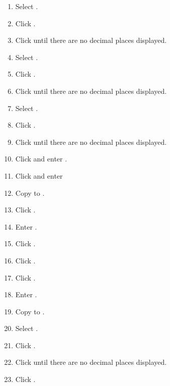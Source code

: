 \begin{enumbox}
\begin{enumerate}
		\item Select .
		\item Click .
		\item Click  until there are no decimal places displayed.
	
		\item Select .
		\item Click .
		\item Click  until there are no decimal places displayed.
	
		\item Select .
		\item Click .
		\item Click  until there are no decimal places displayed.
	
		\item Click  and enter .
		\item Click  and enter 
		\item Copy  to .
	
		\item Click . 
		\item Enter . 
		\item Click .
		\item Click .
	
		\item Click .
		\item Enter .
		\item Copy  to .
	
		\item Select .
		\item Click .
		\item Click  until there are no decimal places displayed.
		\item Click .
		

\end{enumerate}
\end{enumbox}
